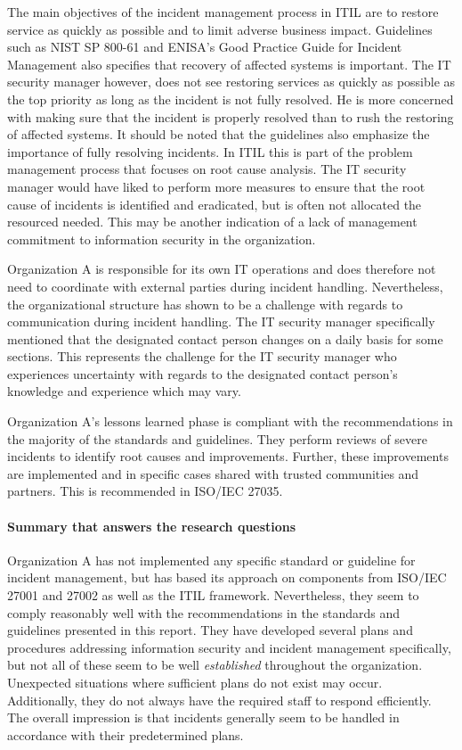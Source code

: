 The main objectives of the incident management process in ITIL are to restore service as quickly as possible and to limit adverse business impact. Guidelines such as NIST SP 800-61 and ENISA's Good Practice Guide for Incident Management also specifies that recovery of affected systems is important.  The IT security manager however, does not see restoring services as quickly as possible as the top priority as long as the incident is not fully resolved. He is more concerned with making sure that the incident is properly resolved than to rush the restoring of affected systems. It should be noted that the guidelines also emphasize the importance of fully resolving incidents. In ITIL this is part of the problem management process that focuses on root cause analysis. The IT security manager would have liked to perform more measures to ensure that the root cause of incidents is identified and eradicated, but is often not allocated the resourced needed. This may be another indication of a lack of management commitment to information security in the organization.

Organization A is responsible for its own IT operations and does therefore not need to coordinate with external parties during incident handling. Nevertheless, the organizational structure has shown to be a challenge with regards to communication during incident handling. The IT security manager specifically mentioned that the designated contact person changes on a daily basis for some sections. This represents the challenge for the IT security manager who experiences uncertainty with regards to the designated contact person's knowledge and experience which may vary.

Organization A's lessons learned phase is compliant with the recommendations in the majority of the standards and guidelines. They perform reviews of severe incidents to identify root causes and improvements. Further, these improvements are implemented and in specific cases shared with trusted communities and partners. This is recommended in ISO/IEC 27035. 

\paragraph{Summary that answers the research questions}
Organization A has not implemented any specific standard or guideline for incident management, but has based its approach on components from ISO/IEC 27001 and 27002 as well as the \ac{ITIL} framework. Nevertheless, they seem to comply reasonably well with the recommendations in the standards and guidelines presented in this report. They have developed several plans and procedures addressing information security and incident management specifically, but not all of these seem to be well \textit{established} throughout the organization. Unexpected situations where sufficient plans do not exist may occur. Additionally, they do not always have the required staff to respond efficiently. The overall impression is that incidents generally seem to be handled in accordance with their predetermined plans.


